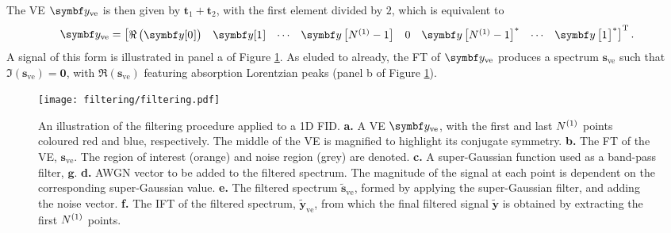 The \ac{VE} $\by_{\text{ve}}$ is then given by $\symbf{t}_1 +
\symbf{t}_2$, with the first element divided by $2$, which is equivalent to
\begin{equation}
    \by_{\text{ve}} =
    \begin{bmatrix}
        \Re\left( \by[0^{\vphantom{(1)}}] \right) &
        \by[1^{\vphantom{(1)}}] &
        \cdots &
        \by\left[\None - 1\right] &
        0 &
        \by\left[\None - 1\right]^* &
        \cdots &
        \by\left[1^{\vphantom{(1)}}\right]^*
    \end{bmatrix}\T.
\end{equation}
A signal of this form is illustrated in panel a of Figure \ref{fig:filtering}. As
eluded to already, the \ac{FT} of $\by_{\text{ve}}$ produces a spectrum
$\symbf{s}_{\text{ve}}$ such that $\Im\left(\symbf{s}_{\text{ve}}\right) =
\symbf{0}$, with $\Re\left(\symbf{s}_{\text{ve}}\right)$ featuring absorption
Lorentzian peaks (panel b of Figure \ref{fig:filtering}).

\begin{figure}
     \centering
     \texttt{[image: filtering/filtering.pdf]}
     \caption{
         An illustration of the filtering procedure applied to a \ac{1D}
         \ac{FID}.
         \textbf{a.} A \ac{VE} $\by_{\text{ve}}$, with the first and last
         $N^{(1)}$ points coloured red and blue, respectively. The middle of the
         \ac{VE} is magnified to highlight its conjugate symmetry.
         \textbf{b.} The \ac{FT} of the \ac{VE}, $\symbf{s}_{\text{ve}}$.
         The region of interest (orange) and noise region (grey) are denoted.
         \textbf{c.} A super-Gaussian function used as a band-pass filter,
         $\symbf{g}$.
         \textbf{d.} \ac{AWGN} vector to be added to the filtered spectrum.
         The magnitude of the signal at each point is dependent on the
         corresponding super-Gaussian value.
         \textbf{e.} The filtered spectrum $\widetilde{\symbf{s}}_{\text{ve}}$,
         formed by applying the super-Gaussian filter, and adding the noise
         vector.
         \textbf{f.} The \ac{IFT} of the filtered spectrum,
         $\widetilde{\symbf{y}}_{\text{ve}}$, from which the final filtered
         signal $\widetilde{\symbf{y}}$ is obtained by extracting
         the first $N^{(1)}$ points.
     }
     \label{fig:filtering}
 \end{figure}

